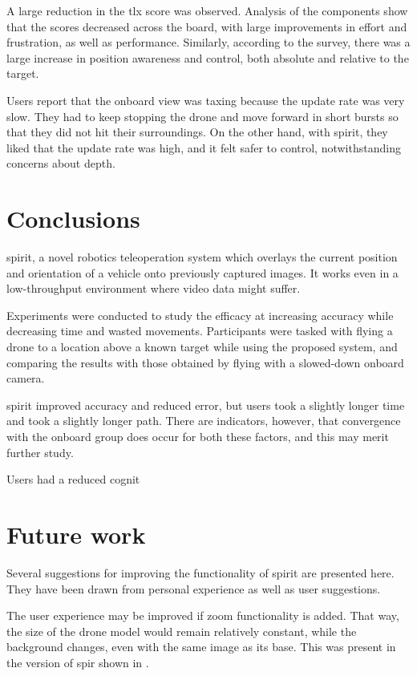 A large reduction in the \gls{tlx} score was observed.
Analysis of the components show that the scores decreased across the board, with large improvements in effort and frustration, as well as performance.
Similarly, according to the survey, there was a large increase in position awareness and control, both absolute and relative to the target.

Users report that the onboard view was taxing because the update rate was very slow.
They had to keep stopping the drone and move forward in short bursts so that they did not hit their surroundings.
On the other hand, with \gls{spirit}, they liked that the update rate was high, and it felt safer to control, notwithstanding concerns about depth.

\chapter{Conclusions}
\label{ch:conclusion}
\gls{spirit}, a novel robotics teleoperation system which overlays the current position and orientation of a vehicle onto previously captured images.
It works even in a low-throughput environment where video data might suffer.

Experiments were conducted to study the efficacy at increasing accuracy while decreasing time and wasted movements.
Participants were tasked with flying a drone to a location above a known target while using the proposed system, and comparing the results with those obtained by flying with a slowed-down onboard camera.

\gls{spirit} improved accuracy and reduced error, but users took a slightly longer time and took a slightly longer path.
There are indicators, however, that convergence with the onboard group does occur for both these factors, and this may merit further study.

Users had a reduced cognit


\chapter{Future work}
Several suggestions for improving the functionality of \gls{spirit} are presented here.
They have been drawn from personal experience as well as user suggestions.

The user experience may be improved if zoom functionality is added.
That way, the size of the drone model would remain relatively constant, while the background changes, even with the same image as its base.
This was present in the version of \gls{spir} shown in \cite{ito2008}.


